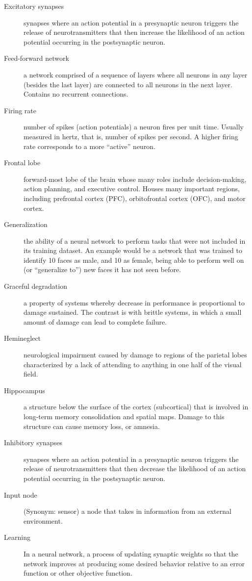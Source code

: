 \begin{description}
\item[Excitatory synapses] synapses where an action potential in a presynaptic neuron triggers the release of neurotransmitters that then increase the likelihood of an action potential occurring in the postsynaptic neuron.
\item[Feed-forward network] a network comprised of a sequence of layers where all neurons in any layer (besides the last layer) are connected to all neurons in the next layer. Contains no recurrent connections.
\item[Firing rate] number of spikes (action potentials) a neuron fires per unit time. Usually measured in hertz, that is, number of spikes per second. A higher firing rate corresponds to a more ``active'' neuron. 
\item[Frontal lobe] forward-most lobe of the brain whose many roles include decision-making, action planning, and executive control. Houses many important regions, including prefrontal cortex (PFC), orbitofrontal cortex (OFC), and motor cortex. 
\item[Generalization] the ability of a neural network to perform tasks that were not included in its training dataset. An example would be a network that was trained to identify 10 faces as male, and 10 as female, being able to perform well on (or ``generalize to'') new faces it has not seen before.
\item[Graceful degradation] a property of systems whereby decrease in performance is proportional to damage sustained. The contrast is with brittle systems, in which a small amount of damage can lead to complete failure.
\item[Hemineglect] neurological impairment caused by damage to regions of the parietal lobes characterized by a lack of attending to anything in one half of the visual field.
\item[Hippocampus] a structure below the surface of the cortex (subcortical) that is involved in long-term memory consolidation and spatial maps. Damage to this structure can cause memory loss, or amnesia. 
\item[Inhibitory synapses] synapses where an action potential in a presynaptic neuron triggers the release of neurotransmitters that then decrease the likelihood of an action potential occurring in the postsynaptic neuron.
\item[Input node] (Synonym: sensor) a node that takes in information from an external environment. 
\item[Learning] In a neural network, a process of updating synaptic weights so that the network improves at producing some desired behavior relative to an error function or other objective function.

\end{description}
